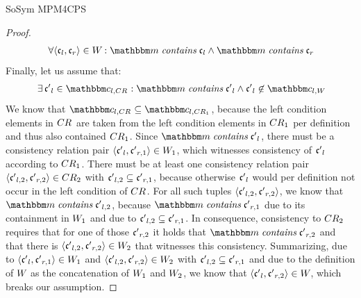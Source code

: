 \begin{copiedFrom}{SoSym MPM4CPS}
\begin{proof}
    \begin{align*}
        \formulaskip &
        \forall \tupled{\conditionelement{c}{l}, \conditionelement{c}{r}} \in  \consistencyrelation{W}{} : \modelset{m} \containsmath \conditionelement{c}{l} \land \modelset{m} \containsmath \conditionelement{c}{r}
    \end{align*}
    Finally, let us assume that: 
    \begin{align*}
        \formulaskip &
        \exists \conditionelement{c'}{l} \in \condition{c}{l,\consistencyrelation{CR}{}} : \modelset{m} \containsmath \conditionelement{c'}{l} \land \conditionelement{c'}{l} \not\in \condition{c}{l,\consistencyrelation{W}{}}
    \end{align*}
    We know that $\condition{c}{l,\consistencyrelation{CR}{}} \subseteq \condition{c}{l,\consistencyrelation{CR}{1}}$, because the left condition elements in $CR_{}$ are taken from the left condition elements in $CR_{1}$ per definition and thus also contained $CR_{1}$.
    Since $\modelset{m} \containsmath \conditionelement{c'}{l}$, there must be a consistency relation pair $\langle \mathfrak{c'}_{l}, \mathfrak{c'}_{r,1} \rangle \in W_{1}$, which witnesses consistency of $\mathfrak{c'}_{l}$ according to $CR_{1}$.
    There must be at least one consistency relation pair $\langle \mathfrak{c'}_{l,2}, \mathfrak{c'}_{r,2} \rangle \in CR_{2}$ with $\mathfrak{c'}_{l,2} \subseteq \mathfrak{c'}_{r,1}$, because otherwise $\mathfrak{c'}_{l}$ would per definition not occur in the left condition of $CR_{}$.
    For all such tuples $\langle \mathfrak{c'}_{l,2}, \mathfrak{c'}_{r,2} \rangle$, we know that $\modelset{m} \containsmath \conditionelement{c'}{l,2}$, because $\modelset{m} \containsmath \conditionelement{c'}{r,1}$ due to its containment in $W_{1}$ and due to $\mathfrak{c'}_{l,2} \subseteq \mathfrak{c'}_{r,1}$.
    In consequence, consistency to $CR_{2}$ requires that for one of those $\mathfrak{c'}_{r,2}$ it holds that $\modelset{m} \containsmath \conditionelement{c'}{r,2}$ and that there is $\langle \mathfrak{c'}_{l,2}, \mathfrak{c'}_{r,2} \rangle \in W_{2}$ that witnesses this consistency.
    Summarizing, due to $\langle \mathfrak{c'}_{l}, \mathfrak{c'}_{r,1} \rangle \in W_{1}$ and $\langle \mathfrak{c'}_{l,2}, \mathfrak{c'}_{r,2} \rangle \in W_{2}$ with $\mathfrak{c'}_{l,2} \subseteq \mathfrak{c'}_{r,1}$ and due to the definition of $W_{}$ as the concatenation of $W_{1}$ and $W_{2}$, we know that $\langle \mathfrak{c'}_{l}, \mathfrak{c'}_{r,2} \rangle \in W_{}$, which breaks our assumption.

\end{proof}
\end{copiedFrom}
